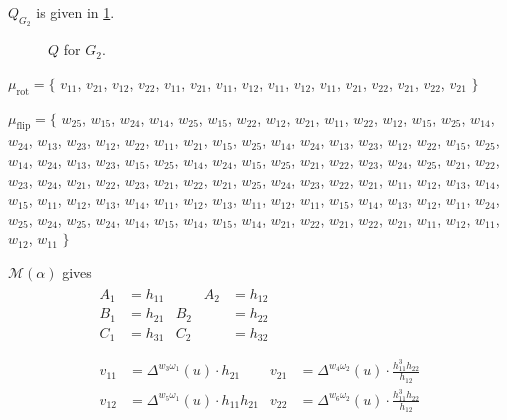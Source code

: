 \documentclass{amsart}
\theoremstyle{plain}
\theoremstyle{definition}
\theoremstyle{remark}
\newcommand{\conftoquiv}{\mathcal{M}}
\newcommand{\fundamentalweight}{\omega}
\newcommand{\genminor}[2]{\Delta^{{#1} \fundamentalweight_{#2}}}
\newcommand{\muflip}{{\mu_{\text{flip}}}}
\newcommand{\murot}{{\mu_{\text{rot}}}}
\newlength\inlmutseqhang
\newcommand{\inlmutseq}[2]{%
  {\small%
    \settowidth\inlmutseqhang{$#1 = \big\{~$~}%
    \hangindent\inlmutseqhang%
    \noindent $#1 = \big\{$ #2 $\big\}$\par}%
}
\begin{document}
  {\centering 

  } $Q_{G_2}$ is given in \cref{fig:QG2}.

  \begin{figure}
    \centering 

    \caption{$Q$ for $G_2$.
      \label{fig:QG2}
    }
  \end{figure}

  \inlmutseq{\murot}{ $v_{1 1}$, $v_{2 1}$, $v_{1 2}$, $v_{2 2}$, $v_{1
      1}$, $v_{2 1}$, $v_{1 1}$, $v_{1 2}$, $v_{1 1}$, $v_{1 2}$, $v_{1
      1}$, $v_{2 1}$, $v_{2 2}$, $v_{2 1}$, $v_{2 2}$, $v_{2 1}$ }

  \inlmutseq{\muflip}{$w_{2 5}$, $w_{1 5}$, $w_{2 4}$, $w_{1 4}$, $w_{2
      5}$, $w_{1 5}$, $w_{2 2}$, $w_{1 2}$, $w_{2 1}$, $w_{1 1}$, $w_{2
      2}$, $w_{1 2}$, $w_{1 5}$, $w_{2 5}$, $w_{1 4}$, $w_{2 4}$, $w_{1
      3}$, $w_{2 3}$, $w_{1 2}$, $w_{2 2}$, $w_{1 1}$, $w_{2 1}$, $w_{1
      5}$, $w_{2 5}$, $w_{1 4}$, $w_{2 4}$, $w_{1 3}$, $w_{2 3}$, $w_{1
      2}$, $w_{2 2}$, $w_{1 5}$, $w_{2 5}$, $w_{1 4}$, $w_{2 4}$, $w_{1
      3}$, $w_{2 3}$, $w_{1 5}$, $w_{2 5}$, $w_{1 4}$, $w_{2 4}$, $w_{1
      5}$, $w_{2 5}$, $w_{2 1}$, $w_{2 2}$, $w_{2 3}$, $w_{2 4}$, $w_{2
      5}$, $w_{2 1}$, $w_{2 2}$, $w_{2 3}$, $w_{2 4}$, $w_{2 1}$, $w_{2
      2}$, $w_{2 3}$, $w_{2 1}$, $w_{2 2}$, $w_{2 1}$, $w_{2 5}$, $w_{2
      4}$, $w_{2 3}$, $w_{2 2}$, $w_{2 1}$, $w_{1 1}$, $w_{1 2}$, $w_{1
      3}$, $w_{1 4}$, $w_{1 5}$, $w_{1 1}$, $w_{1 2}$, $w_{1 3}$, $w_{1
      4}$, $w_{1 1}$, $w_{1 2}$, $w_{1 3}$, $w_{1 1}$, $w_{1 2}$, $w_{1
      1}$, $w_{1 5}$, $w_{1 4}$, $w_{1 3}$, $w_{1 2}$, $w_{1 1}$, $w_{2
      4}$, $w_{2 5}$, $w_{2 4}$, $w_{2 5}$, $w_{2 4}$, $w_{1 4}$, $w_{1
      5}$, $w_{1 4}$, $w_{1 5}$, $w_{1 4}$, $w_{2 1}$, $w_{2 2}$, $w_{2
      1}$, $w_{2 2}$, $w_{2 1}$, $w_{1 1}$, $w_{1 2}$, $w_{1 1}$, $w_{1
      2}$, $w_{1 1}$}

  $\conftoquiv(\alpha)$ gives
  \begin{equation*}
    \begin{gathered}
      \begin{aligned}
        A_1 &= h_{11} &\qquad A_2 &= h_{12} \\
        B_1 &= h_{21} & B_2 &= h_{22} \\
        C_1 &= h_{31} & C_2 &= h_{32} \\
      \end{aligned}
      \\
      \begin{aligned}
        v_{1 1} &= \genminor{w_{3}}{1}(u) \cdot h_{21} & v_{2 1} &= \genminor{w_{4}}{2}(u) \cdot \frac{h_{11}^3 h_{22} }{h_{12}} \\
        v_{1 2} &= \genminor{w_{5}}{1}(u) \cdot h_{11} h_{21} & v_{2 2} &= \genminor{w_{6}}{2}(u) \cdot \frac{h_{11}^3 h_{22} }{h_{12}} \\
      \end{aligned}
    \end{gathered}
  \end{equation*}
\end{document}
